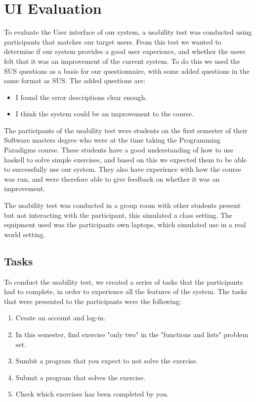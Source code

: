 \section{UI Evaluation} \label{UIEval}
To evaluate the User interface of our system, a usability test was conducted using participants that matches our target users. From this test we wanted to determine if our system provides a good user experience, and whether the users felt that it was an improvement of the current system.
To do this we used the SUS questions as a basis for our questionnaire, with some added questions in the same format as SUS. The added questions are:
\begin{itemize}
    \item I found the error descriptions clear enough.
    \item I think the system could be an improvement to the course.
\end{itemize}
The participants of the usability test were students on the first semester of their Software masters degree who were at the time taking the Programming Paradigms course. 
These students have a good understanding of how to use haskell to solve simple exercises, and based on this we expected them to be able to successfully use our system. They also have experience with how the course was run, and were therefore able to give feedback on whether it was an improvement.

The usability test was conducted in a group room with other students present but not interacting with the participant, this simulated a class setting. 
The equipment used was the participants own laptops, which simulated use in a real world setting.

\subsection*{Tasks}
To conduct the usability test, we created a series of tasks that the participants had to complete, in order to experience all the features of the system.
The tasks that were presented to the participants were the following:
\begin{enumerate}
    \item Create an account and log-in.
    \item In this semester, find exercise "only two" in the "functions and lists" problem set.
    \item Sumbit a program that you expect to not solve the exercise.
    \item Submit a program that solves the exercise.
    \item Check which exercises has been completed by you.
\end{enumerate}


